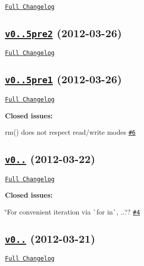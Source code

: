 \href{https://github.com/shelljs/shelljs/compare/v0.0.5pre2...v0.0.5pre3}{\tt Full Changelog}

\subsection*{\href{https://github.com/shelljs/shelljs/tree/v0.0.5pre2}{\tt v0..\+5pre2} (2012-\/03-\/26)}

\href{https://github.com/shelljs/shelljs/compare/v0.0.5pre1...v0.0.5pre2}{\tt Full Changelog}

\subsection*{\href{https://github.com/shelljs/shelljs/tree/v0.0.5pre1}{\tt v0..\+5pre1} (2012-\/03-\/26)}

\href{https://github.com/shelljs/shelljs/compare/v0.0.4...v0.0.5pre1}{\tt Full Changelog}

{\bfseries Closed issues\+:}


\begin{DoxyItemize}
\item rm() does not respect read/write modes \href{https://github.com/shelljs/shelljs/issues/6}{\tt \#6}
\end{DoxyItemize}

\subsection*{\href{https://github.com/shelljs/shelljs/tree/v0.0.4}{\tt v0..} (2012-\/03-\/22)}

\href{https://github.com/shelljs/shelljs/compare/v0.0.3...v0.0.4}{\tt Full Changelog}

{\bfseries Closed issues\+:}


\begin{DoxyItemize}
\item \char`\"{}\+For convenient iteration via \`{}for in\`{}, ...\char`\"{}? \href{https://github.com/shelljs/shelljs/issues/4}{\tt \#4}
\end{DoxyItemize}

\subsection*{\href{https://github.com/shelljs/shelljs/tree/v0.0.3}{\tt v0..} (2012-\/03-\/21)}

\href{https://github.com/shelljs/shelljs/compare/v0.0.2...v0.0.3}{\tt Full Changelog}

